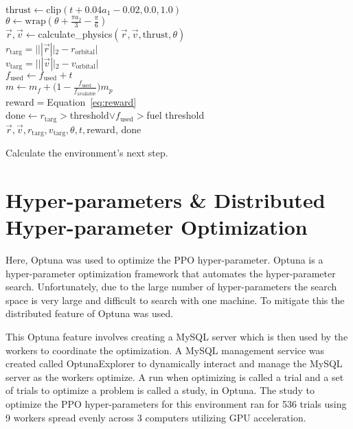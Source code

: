\begin{algorithm}\label{algo:step}
	\SetAlgoLined
	\DontPrintSemicolon
	$\text{thrust}\leftarrow \text{clip}(t + 0.04 a_1 - 0.02, 0.0, 1.0)$\\
	$\theta\leftarrow \text{wrap}(\theta + \frac{\pi a_2}{3}-\frac{\pi}{6})$\\
	$\vec{r}, \vec{v}\leftarrow$calculate\_physics$(\vec{r}, \vec{v}, \text{thrust}, \theta)$\\
	$r_{\text{targ}}=|||\vec{r}||_2-r_{\text{orbital}}|$ \\
	$v_{\text{targ}}=|||\vec{v}||_2-v_{\text{orbital}}|$ \\
	$f_{\text{used}}\leftarrow f_{\text{used}}+t$\\
	$m\leftarrow m_f+\big(1-\frac{f_{\text{used}}}{f_{\text{available}}}\big)m_p$\\
	reward$=$Equation~\ref{eq:reward}\\
	done$\leftarrow r_{\text{targ}}>$threshold$\lor f_{\text{used}}>$fuel threshold\\
	\Return $\vec{r}, \vec{v}, r_{\text{targ}}, v_{\text{targ}}, \theta, t,$reward, done
	\caption{Calculate the environment's next step.}
\end{algorithm}
	
\section{Hyper-parameters \& Distributed Hyper-parameter Optimization}

Here, Optuna \cite{DBLP:journals/corr/abs-1907-10902} was used to optimize the PPO hyper-parameter. Optuna is a hyper-parameter optimization framework that automates the hyper-parameter search. Unfortunately, due to the large number of hyper-parameters the search space is very large and difficult to search with one machine. To mitigate this the distributed feature of Optuna was used.

This Optuna feature involves creating a MySQL server which is then used by the workers to coordinate the optimization. A MySQL management service was created called OptunaExplorer to dynamically interact and manage the MySQL server as the workers optimize. A run when optimizing is called a trial and a set of trials to optimize a problem is called a study, in Optuna. The study to optimize the PPO hyper-parameters for this environment ran for 536 trials using 9 workers spread evenly across 3 computers utilizing GPU acceleration.

